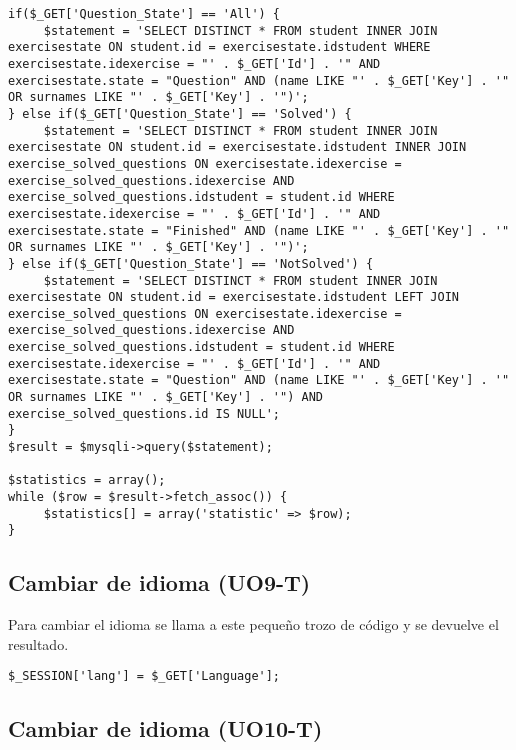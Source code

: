 \noindent
\begin{lstlisting}[caption={Mostrar todas las dudas, las no resueltas o las resueltas.},label={lst:estadisticas-3}]
if($_GET['Question_State'] == 'All') {
     $statement = 'SELECT DISTINCT * FROM student INNER JOIN exercisestate ON student.id = exercisestate.idstudent WHERE exercisestate.idexercise = "' . $_GET['Id'] . '" AND exercisestate.state = "Question" AND (name LIKE "' . $_GET['Key'] . '" OR surnames LIKE "' . $_GET['Key'] . '")';
} else if($_GET['Question_State'] == 'Solved') {
     $statement = 'SELECT DISTINCT * FROM student INNER JOIN exercisestate ON student.id = exercisestate.idstudent INNER JOIN exercise_solved_questions ON exercisestate.idexercise = exercise_solved_questions.idexercise AND exercise_solved_questions.idstudent = student.id WHERE exercisestate.idexercise = "' . $_GET['Id'] . '" AND exercisestate.state = "Finished" AND (name LIKE "' . $_GET['Key'] . '" OR surnames LIKE "' . $_GET['Key'] . '")';
} else if($_GET['Question_State'] == 'NotSolved') {
     $statement = 'SELECT DISTINCT * FROM student INNER JOIN exercisestate ON student.id = exercisestate.idstudent LEFT JOIN exercise_solved_questions ON exercisestate.idexercise = exercise_solved_questions.idexercise AND exercise_solved_questions.idstudent = student.id WHERE exercisestate.idexercise = "' . $_GET['Id'] . '" AND  exercisestate.state = "Question" AND (name LIKE "' . $_GET['Key'] . '" OR surnames LIKE "' . $_GET['Key'] . '") AND exercise_solved_questions.id IS NULL';
}
$result = $mysqli->query($statement);

$statistics = array();
while ($row = $result->fetch_assoc()) {
     $statistics[] = array('statistic' => $row);
}
\end{lstlisting}

\subsection{Cambiar de idioma (UO9-T)}
\label{diseno-e-implementacion:logica-negocio:cambiar-idioma}

Para cambiar el idioma se llama a este pequeño trozo de código y se devuelve el resultado.\\

\noindent
\begin{lstlisting}[caption=Cambiar el idioma de la aplicación.,label={lst:cambiar-idioma}]
$_SESSION['lang'] = $_GET['Language'];
\end{lstlisting}

\subsection{Cambiar de idioma (UO10-T)}
\label{diseno-e-implementacion:logica-negocio:cambiar-asignatura}

